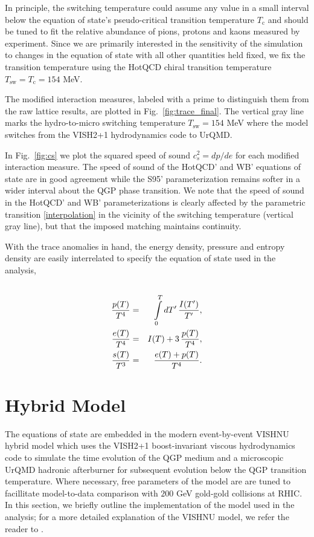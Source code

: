 \documentclass[aps,prc,reprint,amsmath,nofootinbib,superscriptaddress]{revtex4-1}
\begin{document}
In principle, the switching temperature could assume any value in a small interval below the equation of state's pseudo-critical transition temperature $T_\text{c}$ 
and should be tuned to fit the relative abundance of pions, protons and kaons measured by experiment. Since we are primarily interested in the sensitivity of the 
simulation to changes in the equation of state with all other quantities held fixed, we fix the transition temperature using the HotQCD chiral transition temperature 
$T_\text{sw} = T_\text{c} = 154$ MeV.
 
The modified interaction measures, labeled with a prime to distinguish them from the raw lattice results, are plotted in Fig.~\ref{fig:trace_final}. The vertical gray line 
marks the hydro-to-micro switching temperature $T_\text{sw}=154$ MeV where the model switches from the VISH2+1 hydrodynamics code to UrQMD. 

In Fig.~\ref{fig:cs} we plot the squared speed of sound $c_s^2 = dp / de$ for each modified interaction measure. The speed of sound of the HotQCD' and WB' equations
of state are in good agreement while the S95' parameterization remains softer in a wider interval about the QGP phase transition. We note that the speed of sound in 
the HotQCD' and WB' parameterizations is clearly affected by the parametric transition \eqref{interpolation} in the vicinity of the switching temperature (vertical gray line), 
but that the imposed matching maintains continuity.

With the trace anomalies in hand, the energy density, pressure and entropy density are easily interrelated to specify the equation of state used in the analysis,
\begin{eqnarray}
 \cr \frac{p(T)}{T^4} &=& \int\limits_0^T dT'\, \frac{I(T')}{T'}, \\
 \frac{e(T)}{T^4} &=& I(T) + 3\, \frac{p(T)}{T^4}, \\
 \frac{s(T)}{T^3} &=& \frac{e(T) + p(T)}{T^4}. 
\end{eqnarray}
 

\section{Hybrid Model}

The equations of state are embedded in the modern event-by-event VISHNU hybrid model which uses the VISH2+1 boost-invariant viscous hydrodynamics code to simulate the 
time evolution of the QGP medium and a microscopic UrQMD hadronic afterburner for subsequent evolution below the QGP transition temperature. Where necessary, free
parameters of the model are are tuned to facillitate model-to-data comparison with $200$ GeV gold-gold collisions at RHIC. In this section, we briefly outline
the implementation of the model used in the analysis; for a more detailed explanation of the VISHNU model, we refer the reader to \cite{}. 
\end{document}
